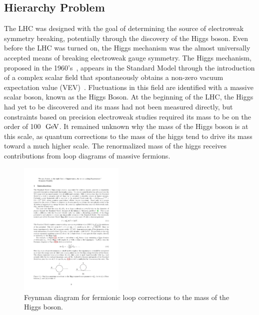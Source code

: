 \subsection{Hierarchy Problem}
The LHC was designed with the goal of determining the source of electroweak symmetry breaking,
potentially through the discovery of the Higgs boson.
Even before the LHC was turned on, the Higgs mechanism was the almost universally accepted
means of breaking electroweak gauge symmetry. %
The Higgs mechanism, proposed in the 1960's~\cite{kibble:1964,Higgs:1964}, appears in the Standard Model through the introduction of a complex scalar field
that spontaneously obtains a non-zero vacuum expectation value (VEV)~\cite{Glashow196159,Weinberg:1967tq,Salam:1968}.
Fluctuations in this field are identified with a massive scalar boson, known as the Higgs Boson.
At the beginning of the LHC, the Higgs had yet to be discovered and its mass had not been measured directly,
but constraints based on precision electroweak studies required its mass to be on the order of 100 $\GeV$.
It remained unknown why the mass of the Higgs boson is at this scale, as quantum corrections to the mass of the higgs
tend to drive its mass toward a much higher scale. %
The renormalized mass of the higgs receives contributions from loop diagrams of massive fermions.
\begin{figure}
  \begin{center}
    \includegraphics[width=50mm]{figures/theory/HiggsMassCorrection}
  \end{center}
  \caption{Feynman diagram for fermionic loop corrections to the mass of the Higgs boson.}
  \label{img:HiggsMassCorrection}
\end{figure}
